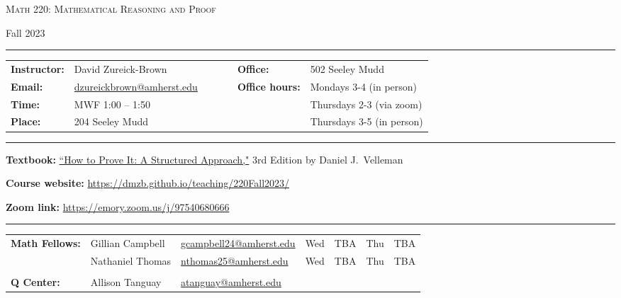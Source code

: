 \documentclass[12pt]{article}
\begin{document}
\begin{center}
{\Large \textsc{Math 220: Mathematical Reasoning and Proof}}
\end{center}
\begin{center}
Fall 2023
\end{center}


\hrule
\smallskip
\noindent \begin{tabular}{@{}llcccll}
\textbf{Instructor:}     & David Zureick-Brown & & &  & \textbf{Office:} & 502 Seeley Mudd \\
  \textbf{Email:}        &  \href{mailto: dzureickbrown@amherst.edu}{dzureickbrown@amherst.edu} & & & &  \textbf{Office hours:} & Mondays 3-4 (in person)\\
  \textbf{Time:}        &  MWF 1:00 -- 1:50  & & & &  &Thursdays 2-3 (via zoom) \\
  \textbf{Place:}        &  204 Seeley Mudd & & & &  & Thursdays 3-5 (in person) 
\end{tabular}
\smallskip
\hrule

\medskip
\noindent\textbf{Textbook:}
\href{https://www.amazon.com/How-Prove-Structured-Daniel-Velleman/dp/1108439535/}
{``How to Prove It: A Structured Approach,"} 3rd Edition by Daniel J.~Velleman
\medskip

\noindent\textbf{Course website:} \url{https://dmzb.github.io/teaching/220Fall2023/}
\medskip

\noindent\textbf{Zoom link:} \url{https://emory.zoom.us/j/97540680666}
\medskip

\hrule
\smallskip

\noindent \begin{tabular}{@{}lllllll}

\textbf{Math Fellows:}      & Gillian Campbell & \href{mailto: gcampbell24@amherst.edu}{gcampbell24@amherst.edu}  & Wed &TBA & Thu &TBA    \\
       &  Nathaniel Thomas &  \href{mailto: nthomas25@amherst.edu}{nthomas25@amherst.edu} & Wed & TBA & Thu & TBA \\

                            &    & & & &  &\\            
\textbf{Q Center:}&  Allison Tanguay  & \href{mailto: atanguay@amherst.edu}{atanguay@amherst.edu} & & &  &
\end{tabular}
\smallskip
\end{document}

